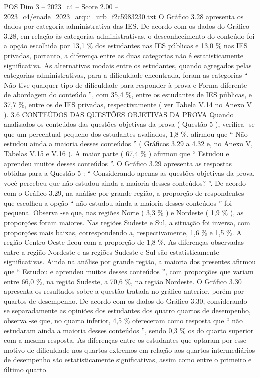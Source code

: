 \begin{textsample}{POS Dim 3 – 2023\_c4 – Score 2.00 – 2023\_c4/enade\_2023\_arqui\_urb\_f2c5983230.txt}
O Gráfico 3.28 apresenta os dados por categoria administrativa das IES.
De acordo com os dados do Gráfico 3.28, em relação às categorias administrativas, o desconhecimento do conteúdo foi a opção escolhida por 13,1 \% dos estudantes nas IES públicas e 13,0 \% nas IES privadas, portanto, a diferença entre as duas categorias não é estatisticamente significativa.
As alternativas modais entre os estudantes, quando agregados pelas categorias administrativas, para a dificuldade encontrada, foram as categorias “ Não tive qualquer tipo de dificuldade para responder à prova e Forma diferente de abordagem do conteúdo ”, com 35,4 \%, entre os estudantes de IES públicas, e 37,7 \%, entre os de IES privadas, respectivamente ( ver Tabela V.14 no Anexo V ). 3.6 CONTEÚDOS DAS QUESTÕES OBJETIVAS DA PROVA Quando analisados os conteúdos das questões objetivas da prova ( Questão 5 ), verifica -se que um percentual pequeno dos estudantes avaliados, 1,8 \%, afirmou que “ Não estudou ainda a maioria desses conteúdos ” ( Gráficos 3.29 a 4.32 e, no Anexo V, Tabelas V.15 e V.16 ).
A maior parte ( 67,4 \% ) afirmou que “ Estudou e aprendeu muitos desses conteúdos ”.
O Gráfico 3.29 apresenta as respostas obtidas para a Questão 5 : “ Considerando apenas as questões objetivas da prova, você percebeu que não estudou ainda a maioria desses conteúdos? ”.
De acordo com o Gráfico 3.29, na análise por grande região, a proporção de respondentes que escolheu a opção “ não estudou ainda a maioria desses conteúdos ” foi pequena.
Observa -se que, nas regiões Norte ( 3,3 \% ) e Nordeste ( 1,9 \% ), as proporções foram maiores.
Nas regiões Sudeste e Sul, a situação foi inversa, com proporções mais baixas, correspondendo a, respectivamente, 1,6 \% e 1,5 \%.
A região Centro-Oeste ficou com a proporção de 1,8 \%.
As diferenças observadas entre a região Nordeste e as regiões Sudeste e Sul são estatisticamente significativas.
Ainda na análise por grande região, a maioria dos presentes afirmou que “ Estudou e aprendeu muitos desses conteúdos ”, com proporções que variam entre 66,0 \%, na região Sudeste, a 70,6 \%, na região Nordeste.
O Gráfico 3.30 apresenta os resultados sobre a questão tratada no gráfico anterior, porém por quartos de desempenho.
De acordo com os dados do Gráfico 3.30, considerando -se separadamente as opiniões dos estudantes dos quatro quartos de desempenho, observa -se que, no quarto inferior, 4,5 \% ofereceram como resposta que “ não estudaram ainda a maioria desses conteúdos ”, sendo 0,3 \% os do quarto superior com a mesma resposta.
As diferenças entre os estudantes que optaram por esse motivo de dificuldade nos quartos extremos em relação aos quartos intermediários de desempenho são estatisticamente significativas, assim como entre o primeiro e último quarto.

\end{textsample}
